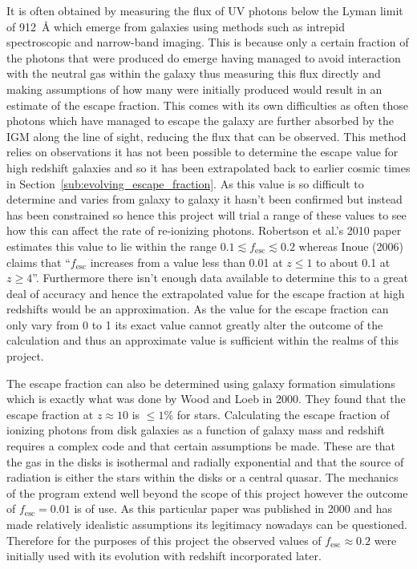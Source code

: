 			It is often obtained by measuring the flux of UV photons below the Lyman limit of \SI{912}{\angstrom} which emerge from galaxies using methods such as intrepid spectroscopic and narrow-band imaging\cite{robertson2010early}. This is because only a certain fraction of the photons that were produced do emerge having managed to avoid interaction with the neutral gas within the galaxy thus measuring this flux directly and making assumptions of how many were initially produced would result in an estimate of the escape fraction. This comes with its own difficulties as often those photons which have managed to escape the galaxy are further absorbed by the IGM along the line of sight, reducing the flux that can be observed. This method relies on observations it has not been possible to determine the escape value for high redshift galaxies and so it has been extrapolated back to earlier cosmic times in Section~\ref{sub:evolving_escape_fraction}. As this value is so difficult to determine and varies from galaxy to galaxy it hasn't been confirmed but instead has been constrained so hence this project will trial a range of these values to see how this can affect the rate of re-ionizing photons. Robertson et al.'s 2010 paper estimates this value to lie within the range $0.1\lesssim f_\text{esc}\lesssim 0.2$\cite{robertson2010early} whereas Inoue (2006) claims that ``$f_\text{esc}$ increases from a value less than 0.01 at $z\le 1$ to about 0.1 at $z\ge 4$''\cite{inoue2006escape}. Furthermore there isn't enough data available to determine this to a great deal of accuracy and hence the extrapolated value for the escape fraction at high redshifts would be an approximation. As the value for the escape fraction can only vary from 0 to 1 its exact value cannot greatly alter the outcome of the calculation and thus an approximate value is sufficient within the realms of this project.

			The escape fraction can also be determined using galaxy formation simulations which is exactly what was done by Wood and Loeb in 2000. They found that the escape fraction at $z\approx 10$ is $\le1$\% for stars\cite{gnedin2008escape}. Calculating the escape fraction of ionizing photons from disk galaxies as a function of galaxy mass and redshift requires a complex code and that certain assumptions be made. These are that the gas in the disks is isothermal and radially exponential and that the source of radiation is either the stars within the disks or a central quasar. The mechanics of the program extend well beyond the scope of this project however the outcome of $f_\text{esc}=0.01$ is of use. As this particular paper was published in 2000 and has made relatively idealistic assumptions its legitimacy nowadays can be questioned. Therefore for the purposes of this project the observed values of $f_\text{esc}\approx 0.2$ were initially used with its evolution with redshift incorporated later.

